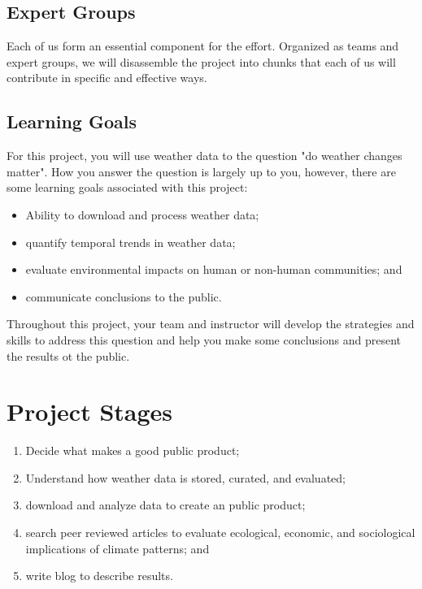 \documentclass{article}\usepackage[]{graphicx}\usepackage[]{color}
\begin{document}
\subsection{Expert Groups}

Each of us form an essential component for the effort. Organized as teams and expert groups, we will disassemble the project into chunks that each of us will contribute in specific and effective ways. 

\subsection{Learning Goals}

For this project, you will use weather data to the question "do weather changes matter". How you answer the question is largely up to you, however, there are some learning goals associated with this project:

\begin{itemize}
  \item Ability to download and process weather data;
  \item quantify temporal trends in weather data;
  \item evaluate environmental impacts on human or non-human communities; and
  \item communicate conclusions to the public.
\end{itemize}

Throughout this project, your team and instructor will develop the strategies and skills to address this question and help you make some conclusions and present the results ot the public.

\section{Project Stages}

\begin{enumerate}
  \item Decide what makes a good public product;
  \item Understand how weather data is stored, curated, and evaluated; 
  \item download and analyze data to create an public product;
  \item search peer reviewed articles to evaluate ecological, economic, and sociological implications of climate patterns; and
  \item write blog to describe results. 
\end{enumerate}
\end{document}
